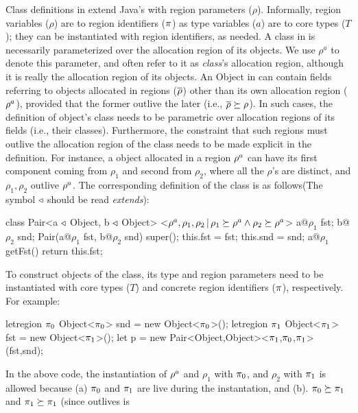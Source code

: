 Class definitions in \FB extend Java's with region parameters
($\rho$). Informally, region variables ($\rho$) are to region
identifiers ($\pi$) as type variables ($a$) are to core types ($T$);
they can be instantiated with region identifiers, as needed. A class
in \FB is necessarily parameterized over the allocation region of its
objects. We use $\rho^a$ to denote this parameter, and often refer to
it as \emph{class}'s allocation region, although it is really the
allocation region of its objects. An Object in \FB can contain fields
referring to objects allocated in regions ($\overline{\rho}$) other than its
own allocation region ($\rho^a$), provided that the former outlive
the later (i.e., $\overline{\rho} \succeq \rho$). In such cases, the
definition of object's class needs to be parametric over allocation
regions of its fields (i.e., their classes). Furthermore, the
constraint that such regions must outlive the allocation region of the
class needs to be made explicit in the definition. For instance, a
 object allocated in a region ${\rho^a}$ can have its first
component coming from ${\rho_1}$ and second from $\rho_2$, where all
the $\rho$'s are distinct, and $\rho_1, \rho_2$ outlive
$\rho^a$. The corresponding definition of the  class is as
follows(The symbol $\triangleleft$ should be read \emph{extends}):  
\begin{codejava}[mathescape=true]
class Pair<a $\triangleleft$ Object, b $\triangleleft$ Object>
          <$\rho^a, \rho_1, \rho_2 \,|\, \rho_1 \succeq \rho^a \wedge \rho_2 \succeq \rho^a$>
           {
  a@$\rho_1$ fst; 
  b@$\rho_2$ snd;
  Pair(a@$\rho_1$ fst, b@$\rho_2$ snd) {
    super(); 
    this.fst = fst; 
    this.snd = snd;
  }
  a@$\rho_1$ getFst() {
    return this.fst;
  }
}
\end{codejava}
To construct objects of the  class, its type and region
parameters need to be instantiated with core types ($T$) and concrete
region identifiers ($\pi$), respectively. For example:
\begin{codejava}
letregion $\pi_0$ {
  Object<$\pi_0$> snd = new Object<$\pi_0$>();
  letregion $\pi_1$ {
    Object<$\pi_1$> fst = new Object<$\pi_1$>();
    let p = new Pair<Object,Object><$\pi_1$,$\pi_0$,$\pi_1$>
                  (fst,snd);
  }
}
\end{codejava}
In the above code, the instantiation of $\rho^a$ and $\rho_1$ with
$\pi_0$, and $\rho_2$ with $\pi_1$ is allowed because (a) $\pi_0$
and $\pi_1$ are live during the instantation, and (b). $\pi_0
\succeq \pi_1$ and $\pi_1 \succeq \pi_1$ (since outlives is
